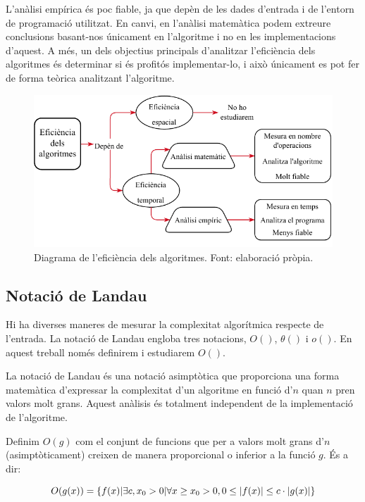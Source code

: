 L'anàlisi empírica és poc fiable, ja que depèn de les dades d'entrada i de l'entorn de programació utilitzat. En canvi, en l'anàlisi matemàtica podem extreure conclusions basant-nos únicament en l'algoritme i no en les implementacions d'aquest. A més, un dels objectius principals d'analitzar l'eficiència dels algoritmes és determinar si és profitós implementar-lo, i això únicament es pot fer de forma teòrica analitzant l'algoritme.

\begin{figure}[H]
    \centering
    \includegraphics[width=.8\textwidth]{capitols/figures/diagram.drawio (1).pdf}
    \caption[Diagrama de l'eficiència dels algoritmes.]{Diagrama de l'eficiència dels algoritmes. Font: elaboració pròpia.}
    \label{Figura}
\end{figure}

\subsection{Notació de Landau}
Hi ha diverses maneres de mesurar la complexitat algorítmica respecte de l'entrada. La notació de Landau engloba tres notacions, $O()$, $\theta()$ i $o()$. En aquest treball només definirem i estudiarem $O()$.

La notació de Landau és una notació asimptòtica que proporciona una forma matemàtica d'expressar la complexitat d'un algoritme en funció d'$n$ quan $n$ pren valors molt grans. Aquest anàlisis és totalment independent de la implementació de l'algoritme.

Definim $O(g)$ com el conjunt de funcions que per a valors molt grans d'$n$ (asimptòticament) creixen de manera proporcional o inferior a la funció $g$. És a dir:


\[{\large  O(g(x)) = \{f(x) | \exists c, x_0 > 0 | \forall x \geq x_0 > 0, 0 \leq |f(x)| \leq c \cdot |g(x)| \}} \]

